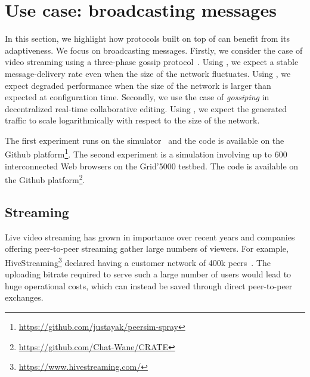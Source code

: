 
\section{Use case: broadcasting messages}
\label{sec:usecase}



In this section, we highlight how protocols built on top of \SPRAY can
benefit from its adaptiveness. We focus on broadcasting
messages. Firstly, we consider the case of video streaming using a
three-phase gossip protocol~\cite{FlightPath,Frey09DSN,monod:THESIS}.
Using \SPRAY, we expect a stable message-delivery rate even when the
size of the network fluctuates. Using \CYCLON, we expect degraded
performance when the size of the network is larger than expected at
configuration time. Secondly, we use the case of \emph{gossiping} in
decentralized real-time collaborative editing. Using \SPRAY, we expect
the generated traffic to scale logarithmically with respect to the
size of the network.

The first experiment runs on the \PEERSIM simulator~\cite{montresor2009peersim}
and the code is available on the Github
platform\footnote{\url{https://github.com/justayak/peersim-spray}}. The second
experiment is a simulation involving up to 600 interconnected Web browsers on
the Grid'5000 testbed. The code is available on the Github
platform\footnote{\url{https://github.com/Chat-Wane/CRATE}}.

\subsection{Streaming}

Live video streaming has grown in importance over recent years and
companies offering peer-to-peer streaming gather large numbers of
viewers. For example,
HiveStreaming\footnote{\url{https://www.hivestreaming.com/}} declared
having a customer network of 400k peers~\cite{smoothcache2}. The
uploading bitrate required to serve such a large number of users would
lead to huge operational costs, which can instead be saved through
direct peer-to-peer exchanges.

